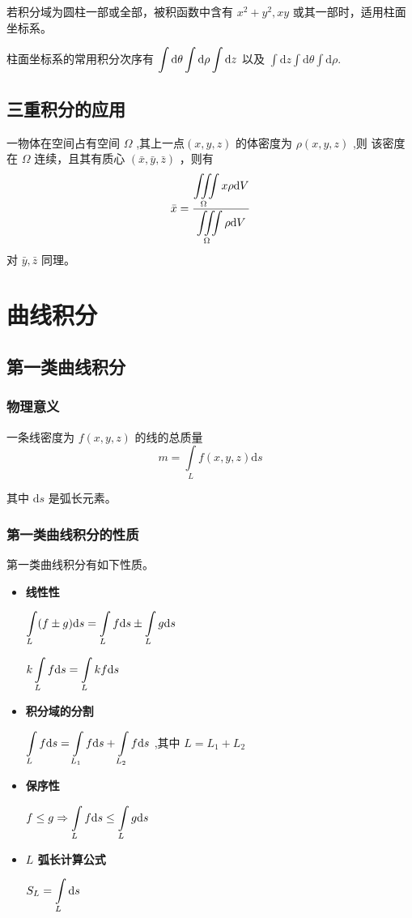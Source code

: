 若积分域为圆柱一部或全部，被积函数中含有 $ x^2+y^2,xy $ 或其一部时，适用柱面坐标系。

柱面坐标系的常用积分次序有 $\displaystyle \int \mathrm{d}\theta\int \mathrm{d}\rho \int \mathrm{d}z$ 以及 $ 
\int \mathrm{d}z \int \mathrm{d}\theta \int \mathrm{d}\rho .$ 

\subsection{三重积分的应用}

\begin{Theo}[质心公式]

    一物体在空间占有空间 $ \Omega $ ,其上一点$ (x,y,z) $ 的体密度为 $ \rho(x,y,z) $ ,则
    该密度在 $ \Omega $ 连续，且其有质心 $ (\bar x,\bar y,\bar z) $ ，则有$$
        \bar x = \dfrac{\displaystyle \iiint\limits_{\Omega}x\rho \mathrm{d}V}{\displaystyle \iiint\limits_{\Omega}\rho \mathrm{d}V}
    $$ 
    对 $ \bar y,\bar z $ 同理。
\end{Theo}

\section{曲线积分}

\subsection{第一类曲线积分}

\subsubsection{物理意义}

一条线密度为 $ f(x,y,z) $ 的线的总质量$$
    m = \int\limits_L f(x,y,z)\mathrm{d}s
$$ 

其中 $ \mathrm{d}s $ 是弧长元素。

\subsubsection{第一类曲线积分的性质}

第一类曲线积分有如下性质。
\begin{itemize}
    \item \textbf{线性性}
    
    $\displaystyle \int\limits_L (f\pm g)\mathrm{d}s = \int\limits_L f\mathrm{d}s \pm \int\limits_Lg\mathrm{d}s $ 

    $ \displaystyle k\int\limits_L f\mathrm{d}s = \int\limits_Lkf\mathrm{d}s $ 
    \item \textbf{积分域的分割}
    
    $\displaystyle \int\limits_Lf\mathrm{d}s = \int\limits_{L_1}f\mathrm{d}s + \int\limits_{L_2}f\mathrm{d}s$
    ,其中 $ L=L_1+L_2 $ 
    \item \textbf{保序性}
    
    $\displaystyle f\leq g\Rightarrow \int\limits_L f\mathrm{d}s \leq \int\limits_L g\mathrm{d}s$ 
    \item \textbf{$ L $ 弧长计算公式}
    
    $\displaystyle S_L = \int\limits_L\mathrm{d}s$ 
\end{itemize}

